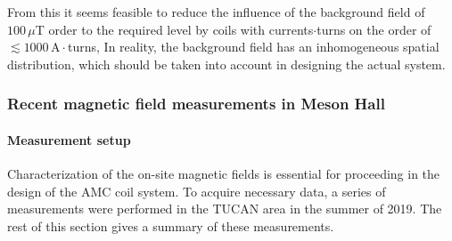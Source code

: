 From this it seems feasible to reduce the influence of the background field of $100\,\mu$T order to the required level by coils with currents$\cdot$turns on the order of $\lesssim 1000\,\mathrm{A}\cdot$turns, In reality, the background field has an inhomogeneous spatial distribution, which should be taken into account in designing the actual system. 




\subsubsection{Recent magnetic field measurements in Meson Hall}\label{sec:amc_recent}
\paragraph*{Measurement setup}
Characterization of the on-site magnetic fields is essential for proceeding in the design of the AMC coil system. To acquire necessary data, a series of measurements were performed in the TUCAN area in the summer of 2019. The rest of this section gives a summary of these measurements.

